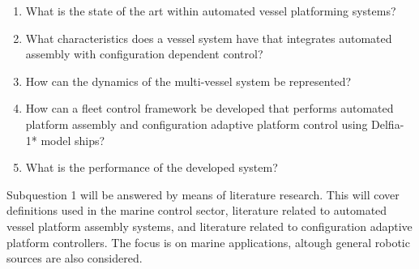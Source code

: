 \begin{enumerate}
	\item What is the state of the art within automated vessel platforming systems?
	\item What characteristics does a vessel system have that integrates automated assembly with configuration dependent control?
\item How can the dynamics of the multi-vessel system be represented?
	\item How can a fleet control framework be developed that performs automated platform assembly and configuration adaptive platform control using Delfia-1* model ships? 
	\item What is the performance of the developed system?
\end{enumerate}

Subquestion 1 will be answered by means of literature research. This will cover definitions used in the marine control sector, literature related to automated vessel platform assembly systems, and literature related to configuration adaptive platform controllers. The focus is on marine applications, altough general robotic sources are also considered. 



